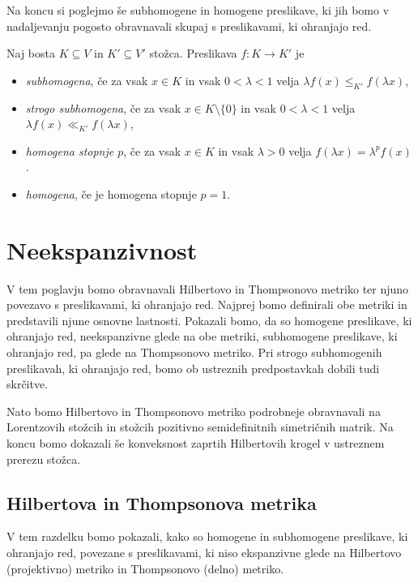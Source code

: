 \documentclass[mat2, tisk]{fmfdelo}
\begin{document}
Na koncu si poglejmo še subhomogene in homogene
preslikave, ki jih bomo v nadaljevanju pogosto
obravnavali skupaj s preslikavami, ki ohranjajo red. 
\begin{definicija}
  Naj bosta $K \subseteq V$ in $K' \subseteq V'$ stožca. Preslikava
  $f \colon K \to K'$ je 
  \begin{itemize}
    \item \emph{subhomogena}, če za vsak $x \in K$ in vsak $0 < \lambda < 1$ velja
      $\lambda f(x) \leq_{K'} f(\lambda x)$,
    \item \emph{strogo subhomogena}, če za vsak
      $x \in K \setminus \{0\}$ in vsak $0 < \lambda < 1$ velja
      $\lambda f(x) \ll_{K'} f(\lambda x)$,
    \item \emph{homogena stopnje $p$}, če za vsak
      $x \in K$ in vsak $\lambda > 0$ velja
      $f(\lambda x)=\lambda^p f(x)$.
    \item \emph{homogena}, če je homogena stopnje $p=1$.
  \end{itemize}
\end{definicija}





\section{Neekspanzivnost}

V tem poglavju bomo obravnavali Hilbertovo in Thompsonovo
metriko ter njuno povezavo s preslikavami, ki ohranjajo red.
Najprej bomo definirali obe metriki in predstavili njune
osnovne lastnosti. Pokazali bomo, da so homogene preslikave,
ki ohranjajo red, neekspanzivne glede na obe metriki,
subhomogene preslikave, ki ohranjajo red, pa glede na
Thompsonovo metriko. Pri strogo subhomogenih preslikavah,
ki ohranjajo red, bomo ob ustreznih predpostavkah
dobili tudi skrčitve.

Nato bomo Hilbertovo in Thompsonovo metriko podrobneje
obravnavali na Lorentzovih stožcih in stožcih pozitivno
semidefinitnih simetričnih matrik. Na koncu bomo dokazali
še konveksnost zaprtih Hilbertovih krogel v ustreznem
prerezu stožca.

\subsection{Hilbertova in Thompsonova metrika}

V tem razdelku bomo pokazali, kako so homogene in subhomogene preslikave, ki ohranjajo red, povezane s preslikavami, 
ki niso ekspanzivne glede na Hilbertovo (projektivno) metriko in Thompsonovo (delno) metriko.
\end{document}
